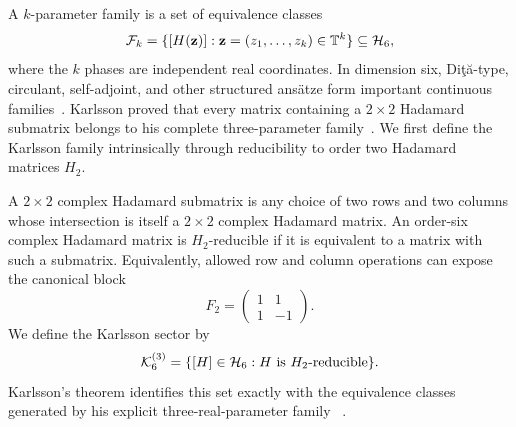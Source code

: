 A $k$-parameter family is a set of equivalence classes
\begin{equation}
\mathcal F_k=\{[H(\mathbf z)]:\mathbf z=(z_1,\ldots,z_k)\in\mathbb T^k\}
\subseteq\mathcal H_6,
\end{equation}
where the $k$ phases are independent real coordinates.
%
In dimension six, Di\c{t}\u{a}-type, circulant, self-adjoint, and other structured ansätze form important continuous families~\cite{Dita2004,BeauchampNicoara2008,MatolcsiSzollosi2008,
Szollosi2010Hypocycloids}. 
Karlsson proved that every matrix containing a $2\times2$ Hadamard submatrix belongs to his complete three-parameter
family~\cite{Karlsson2011H2,Karlsson2011ThreeParameter}. 
%
We first define the Karlsson family intrinsically through reducibility to order two Hadamard matrices $H_2$.
\begin{definition}
A $2\times2$ complex Hadamard submatrix is any choice of two rows and two columns whose intersection is itself a $2\times2$ complex Hadamard matrix. An order-six complex Hadamard matrix is $H_2$-reducible if it is equivalent to a matrix with such a submatrix. Equivalently, allowed row and column operations can expose the
canonical block
\begin{equation}
F_2=\begin{pmatrix}1&1\\1&-1\end{pmatrix}.
\label{eq:F2}
\end{equation}
We define the Karlsson sector by
\begin{equation}
    \mathcal K_6^{(3)}=\{[H]\in\mathcal H_6:H\text{ is }H_2\text{-reducible}\}.
\label{eq:karlsson}
\end{equation}
Karlsson's theorem identifies this set exactly with the equivalence classes generated by his explicit three-real-parameter family
~\cite{Karlsson2011H2,Karlsson2011ThreeParameter}.
\end{definition}



